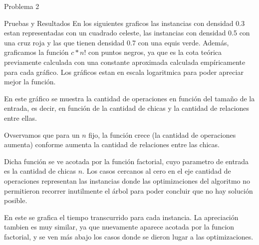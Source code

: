 \begin{section}{Problema 2}
\begin{subsection}{Pruebas y Resultados}
		En los siguientes graficos las instancias con densidad 0.3 estan representadas con un cuadrado celeste, las instancias con densidad 0.5 con una cruz roja y las que tienen densidad 0.7 con una equis verde. Además, graficamos la función $c*n!$ con puntos negros, ya que es la cota teórica previamente calculada con una constante aproximada calculada empíricamente para cada gráfico.
		Los gráficos estan en escala logaritmica para poder apreciar mejor la función.\VSP
		
		\newpage

		\VSP

		En este gráfico se muestra la cantidad de operaciones en función del tamaño de la entrada, es decir, en función de la cantidad de chicas y la cantidad de relaciones entre ellas.

		Ovservamos que para un $n$ fijo, la función crece (la cantidad de operaciones aumenta) conforme aumenta la cantidad de relaciones entre las chicas.

		Dicha función se ve acotada por la función factorial, cuyo parametro de entrada es la cantidad de chicas $n$. Los casos cercanos al cero en el eje cantidad de operaciones representan las instancias donde las optimizaciones del algoritmo no permitieron recorrer inutilmente el árbol para poder concluir que no hay solución posible.\VSP

		\newpage

		\VSP

		En este se grafica el tiempo transcurrido para cada instancia. La apreciación tambien es muy similar, ya que nuevamente aparece acotada por la funcion factorial, y se ven más abajo los casos donde se dieron lugar a las optimizaciones.
	\end{subsection}
\end{section}
